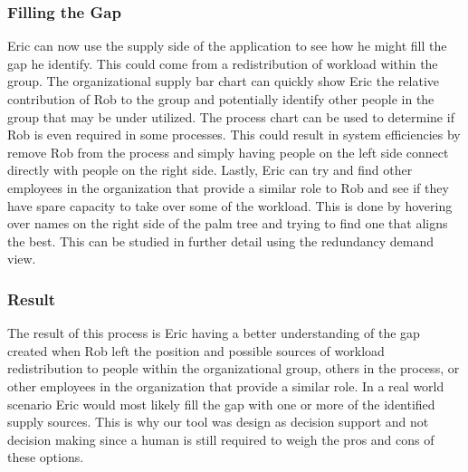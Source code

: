\documentclass[journal]{vgtc}                %
\begin{document}
\subsubsection{Filling the Gap}
Eric can now use the supply side of the application to see how he might fill the gap he identify.  This could come from a redistribution of workload within the group.  The organizational supply bar chart can quickly show Eric the relative contribution of Rob to the group and potentially identify other people in the group that may be under utilized.
The process chart can be used to determine if Rob is even required in some processes.  This could result in system efficiencies by remove Rob from the process and simply having people on the left side connect directly with people on the right side.
Lastly, Eric can try and find other employees in the organization that provide a similar role to Rob and see if they have spare capacity to take over some of the workload.  This is done by hovering over names on the right side of the palm tree and trying to find one that aligns the best.  This can be studied in further detail using the redundancy demand view.

\subsubsection{Result}
The result of this process is Eric having a better understanding of the gap created when Rob left the position and possible sources of workload redistribution to people within the organizational group, others in the process, or other employees in the organization that provide a similar role.
In a real world scenario Eric would most likely fill the gap with one or more of the identified supply sources.  This is why our tool was design as decision support and not decision making since a human is still required to weigh the pros and cons of these options.
\end{document}
